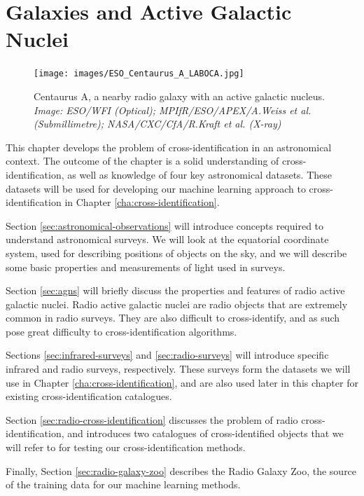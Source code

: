 \chapter{Galaxies and Active Galactic Nuclei}
\label{cha:astro}


    \begin{figure}[!ht]
        \centering
        \texttt{[image: images/ESO\_Centaurus\_A\_LABOCA.jpg]}
        \caption{Centaurus A, a nearby radio galaxy with an active galactic
            nucleus. \emph{Image: ESO/WFI (Optical); MPIfR/ESO/APEX/A.Weiss et
            al. (Submillimetre); NASA/CXC/CfA/R.Kraft et al. (X-ray)}}
        \label{fig:centaurus-a}
    \end{figure}


    This chapter develops the problem of cross-identification in an astronomical
    context. The outcome of the chapter is a solid understanding of
    cross-identification, as well as knowledge of four key astronomical
    datasets. These datasets will be used for developing our machine learning
    approach to cross-identification in Chapter \ref{cha:cross-identification}.

    Section \ref{sec:astronomical-observations} will introduce concepts required
    to understand astronomical surveys. We will look at the equatorial
    coordinate system, used for describing positions of objects on the sky, and
    we will describe some basic properties and measurements of light used in
    surveys.

    Section \ref{sec:agns} will briefly discuss the properties and features of
    radio active galactic nuclei. Radio active galactic nuclei are radio objects
    that are extremely common in radio surveys. They are also difficult to
    cross-identify, and as such pose great difficulty to cross-identification
    algorithms.

    Sections \ref{sec:infrared-surveys} and \ref{sec:radio-surveys} will
    introduce specific infrared and radio surveys, respectively. These surveys
    form the datasets we will use in Chapter \ref{cha:cross-identification}, and
    are also used later in this chapter for existing cross-identification
    catalogues.

    Section \ref{sec:radio-cross-identification} discusses the problem of radio
    cross-identification, and introduces two catalogues of cross-identified
    objects that we will refer to for testing our cross-identification methods.

    Finally, Section \ref{sec:radio-galaxy-zoo} describes the Radio Galaxy Zoo,
    the source of the training data for our machine learning methods.

